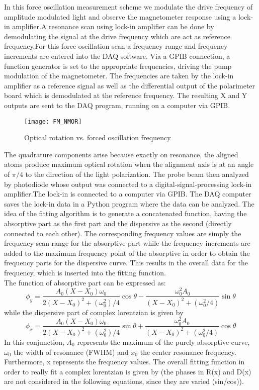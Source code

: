 \documentclass[12pt]{report}
\begin{document}
 In this force oscillation measurement scheme we modulate the drive frequency of amplitude modulated light and  observe the magnetometer response using a lock-in amplifier.A resonance scan using lock-in amplifier can be done by demodulating the signal at the drive frequency which are act as reference frequency.For this force oscillation scan a frequency range and frequency increments are entered into the DAQ software. Via a
GPIB connection, a function generator is set to the appropriate frequencies, driving
the pump modulation of the magnetometer. The frequencies are taken by the lock-in
amplifier as a reference signal as well as the differential output of the polarimeter board
which is demodulated at the reference frequency. The resulting X and Y outputs are sent to the DAQ program, running on a computer via GPIB. 
\begin{figure}[h]
\centering\texttt{[image: FM\_NMOR]}
\caption{Optical rotation vs. forced oscillation frequency}
\end{figure}
The quadrature components arise because exactly on resonance, the aligned atoms produce maximum optical rotation when the alignment axis is at an angle of $ \pi/4$   to the direction of the light polarization.  
The probe beam then analyzed by photodiode whose output was connected to a digital-signal-processing lock-in amplifier.The lock-in is connected to a computer via GPIB. The DAQ computer saves the lock-in data in  a Python program where the data can be analyzed. The idea of the fitting algorithm is to generate a concatenated function, having the absorptive part as the first part and the dispersive as the second (directly connected to each other). The corresponding frequency values are simply the frequency scan range for the absorptive part while the frequency increments are added to the maximum frequency point of the absorptive in order to obtain the frequency parts for the dispersive curve. This results in
the overall data for the frequency, which is inserted into the fitting function.\\
The function of absorptive part can be expressed as:
\begin{equation}
\phi_y= \frac{A_0 (X-X_0 )\omega_0}{2(X-X_0 )^2+(\omega_0^2)/4}\cos\theta-\frac{\omega_0^2A_0}{(X-X_0 )^2+(\omega_0^2/4)}\sin\theta
\end{equation}
while the dispersive part of complex lorentzian is given by 
\begin{equation}
\phi_x= \frac{A_0 (X-X_0 )\omega_0}{2(X-X_0 )^2+(\omega_0^2)/4}\sin\theta+\frac{\omega_0^2A_0}{(X-X_0 )^2+(\omega_0^2/4)}\cos\theta
\end{equation}
In this conjunction, $A_0$ represents the maximum of the purely absorptive curve, $\omega_0$ the width
of resonance (FWHM) and $x_0$ the center resonance frequency. Furthermore, x represents
the frequency values.
The overall fitting function in order to really fit a complex lorentzian is given by (the
phases in R(x) and D(x) are not considered in the following equations, since they are varied
(sin/cos)).\\
\end{document}

